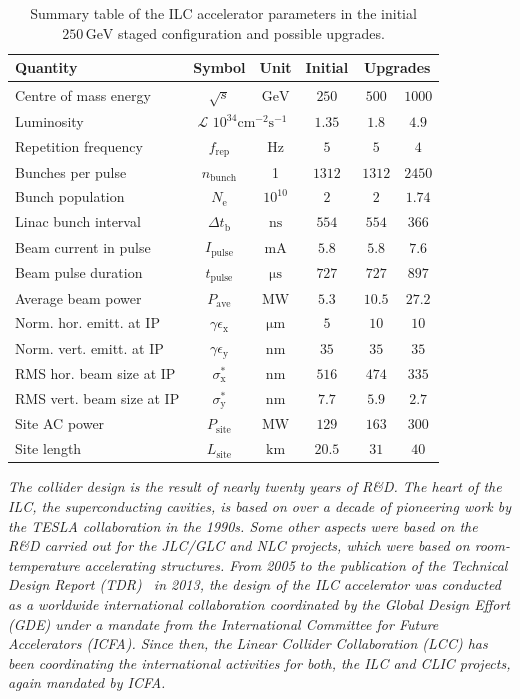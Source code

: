 \documentclass[%
 reprint,
 amsmath,amssymb,
 aps,
]{revtex4-1}
\begin{document}
\begin{table}
\begin{tabular}{lccccc}
Quantity & Symbol & Unit & Initial &  \multicolumn{2}{c}{Upgrades} \\
\hline
Centre of mass energy & $\sqrt{s}$ & ${\mathrm{GeV}}$ & $250$ & $500$ & $1000$ \\
Luminosity & \multicolumn{2}{c}{${\mathcal{L}}$ $10^{34}{\mathrm{cm^{-2}s^{-1}}}$} & $1.35$ & $1.8$ & $4.9$ \\
Repetition frequency &$f_{\mathrm{rep}}$ & ${\mathrm{Hz}}$  & $5$ & $5$ & $4$ \\
Bunches per pulse  &$n_{\mathrm{bunch}}$ & 1  & $1312$ & $1312$ & $2450$ \\
Bunch population  &$N_{\mathrm{e}}$ & $10^{10}$ &$2$ & $2$ & $1.74$ \\
Linac bunch interval & $\Delta t_{\mathrm{b}}$ & ${\mathrm{ns}}$ & $554$ & $554$ & $366$ \\
Beam current in pulse & $I_{\mathrm{pulse}}$ & ${\mathrm{mA}}$& $5.8$ & $5.8$ & $7.6$  \\
Beam pulse duration  & $t_{\mathrm{pulse}}$ & ${\mathrm{\mu s}}$ &$727$ & $727$ & $897$ \\
Average beam power  & $P_{\mathrm{ave}}$   & ${\mathrm{MW}}$ & $5.3$   &$10.5$  & $27.2$ \\  
Norm. hor. emitt. at IP & $\gamma\epsilon_{\mathrm{x}}$ & ${\mathrm{\mu m}}$& $5$ & $10$ & $10$  \\ 
Norm. vert. emitt. at IP & $\gamma\epsilon_{\mathrm{y}}$ & ${\mathrm{nm}}$ & $35$ & $35$ & $35$ \\ 
RMS hor. beam size at IP  & $\sigma^*_{\mathrm{x}}$ & ${\mathrm{nm}}$  & $516$ & $474$ & $335$ \\
RMS vert. beam size at IP &$\sigma^*_{\mathrm{y}}$ & ${\mathrm{nm}}$ & $7.7$  & $5.9$ & $2.7$ \\
Site AC power  & $P_{\mathrm{site}}$ &  ${\mathrm{MW}}$ & $129$ & $163$ & $300$ \\
Site length & $L_{\mathrm{site}}$ &  ${\mathrm{km}}$ & $20.5$ & $31$ & $40$ \\
\end{tabular}
\caption{Summary table of the ILC accelerator parameters in the initial $250\,{\mathrm{GeV}}$ staged configuration
and possible upgrades.
\label{tab:ilc-params}}
\end{table}

{\it
The collider design is the result of nearly twenty years of R\&D. 
The heart of the ILC, the superconducting cavities, is based on over a decade of pioneering work by the TESLA collaboration in the 1990s. 
Some other aspects were based on the R\&D carried out for the JLC/GLC and NLC projects, which were based on room-temperature accelerating structures. 
From 2005 to the publication of the Technical Design Report (TDR)~\cite{Adolphsen:2013kya} in 2013, the design of the ILC accelerator was conducted as a worldwide international collaboration coordinated by the Global Design Effort (GDE) under a mandate from the International Committee for Future Accelerators (ICFA).
Since then, the Linear Collider Collaboration (LCC) has been coordinating the international activities for both, the ILC and CLIC projects, again mandated by ICFA.
}
\end{document}
